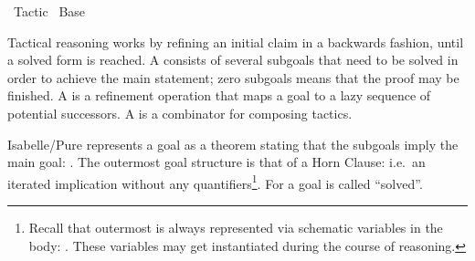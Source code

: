 %
\begin{isabellebody}%
\def\isabellecontext{Tactic}%
%
\isadelimtheory
%
\endisadelimtheory
%
\isatagtheory
{}\isamarkupfalse%
\ Tactic\isanewline
{}\ Base\isanewline
{}%
\endisatagtheory
{\isafoldtheory}%
%
\isadelimtheory
%
\endisadelimtheory
%
\isamarkuptrue%
%
\begin{isamarkuptext}%
Tactical reasoning works by refining an initial claim in a
  backwards fashion, until a solved form is reached.  A 
  consists of several subgoals that need to be solved in order to
  achieve the main statement; zero subgoals means that the proof may
  be finished.  A  is a refinement operation that maps
  a goal to a lazy sequence of potential successors.  A  is a combinator for composing tactics.%
\end{isamarkuptext}%
\isamarkuptrue%
%
\isamarkuptrue%
%
\begin{isamarkuptext}%
Isabelle/Pure represents a goal as a theorem stating that the
  subgoals imply the main goal: .  The outermost goal structure is that of a Horn Clause: i.e.\
  an iterated implication without any quantifiers\footnote{Recall that
  outermost  is always represented via schematic
  variables in the body: \isa{{\isaliteral{5C3C7068693E}{\isasymphi}}{\isaliteral{5B}{\isacharbrackleft}}{\isaliteral{3F}{\isacharquery}}x{\isaliteral{5D}{\isacharbrackright}}}.  These variables may get
  instantiated during the course of reasoning.}.  For \isa{n\ {\isaliteral{3D}{\isacharequal}}\ {\isadigit{0}}}
  a goal is called ``solved''.


\end{isamarkuptext}
\end{isabellebody}
